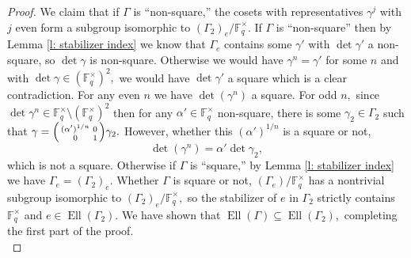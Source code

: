 \documentclass[11pt]{amsart}
\theoremstyle{definition}
\newenvironment{psmallmatrix}
{\left(\begin{smallmatrix}}
	{\end{smallmatrix}\right)}
\numberwithin{equation}{section}
\newcommand{\bbF}{\mathbb{F}}		%
\begin{document}
\begin{proof}
			We claim that if $\Gamma$ is ``non-square,'' the cosets with representatives 
			$\gamma^j$
			with $j$ even form a subgroup isomorphic to $(\Gamma_2)_e/\bbF_q^{\times}.$ 
			If $\Gamma$ is ``non-square'' then by Lemma \ref{l: stabilizer index} we know that $\Gamma_e$ contains some $\gamma'$ with $\det\gamma'$ a non-square, so $\det\gamma$ is non-square. Otherwise we would have $\gamma^n=\gamma'$ for some $n$ and with $\det\gamma\in (\bbF_q^{\times})^2,$ we would have $\det\gamma'$ a square which is a clear contradiction.
			For any even $n$ we have $\det(\gamma^n)$ a square.
			For odd $n,$ since $\det\gamma^n\in \bbF_q^{\times}\setminus(\bbF_q^{\times})^2$ then for any $\alpha'\in \bbF_q^{\times}$ non-square, there is some $\gamma_2\in \Gamma_2$ such that $\displaystyle{\gamma=\begin{psmallmatrix}(\alpha')^{1/n}&0\\0&1\end{psmallmatrix}\gamma_2}.$ However, whether this $(\alpha')^{1/n}$ is a square or not, 
			\[\det(\gamma^n)=\alpha'\det\gamma_2,\]
			which is not a square. Otherwise if $\Gamma$ is ``square,'' by Lemma \ref{l: stabilizer index} we have $\Gamma_e=(\Gamma_2)_e.$  
			Whether $\Gamma$ is square or not, $(\Gamma_e)/\bbF_q^{\times}$ has a nontrivial subgroup isomorphic to $(\Gamma_2)_e/\bbF_q^{\times},$ so the stabilizer of $e$ in $\Gamma_2$ strictly contains $\bbF_q^{\times}$ and $e\in \operatorname{Ell}(\Gamma_2).$ We have shown that $\operatorname{Ell}(\Gamma)\subseteq \operatorname{Ell}(\Gamma_2),$ completing the first part of the proof.\\
			

\end{proof}
\end{document}
